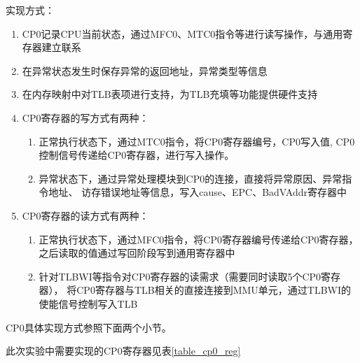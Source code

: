             实现方式：
            \begin{enumerate}
                \item
                    CP0记录CPU当前状态，通过MFC0、MTC0指令等进行读写操作，与通用寄存器建立联系
                \item
                    在异常状态发生时保存异常的返回地址，异常类型等信息
                \item
                    在内存映射中对TLB表项进行支持，为TLB充填等功能提供硬件支持
                \item
                    CP0寄存器的写方式有两种：
                    \begin{enumerate}
                        \item
                            正常执行状态下，通过MTC0指令，将CP0寄存器编号，CP0写入值,
                            CP0控制信号传递给CP0寄存器，进行写入操作。
                        \item
                            异常状态下，通过异常处理模块到CP0的连接，直接将异常原因、异常指令地址、
                            访存错误地址等信息，写入cause、EPC、BadVAddr寄存器中
                    \end{enumerate}
                \item
                    CP0寄存器的读方式有两种：
                    \begin{enumerate}
                        \item
                            正常执行状态下，通过MFC0指令，将CP0寄存器编号传递给CP0寄存器，
                            之后读取的值通过写回阶段写到通用寄存器中
                        \item
                            针对TLBWI等指令对CP0寄存器的读需求（需要同时读取5个CP0寄存器），
                            将CP0寄存器与TLB相关的直接连接到MMU单元，通过TLBWI的使能信号控制写入TLB
                    \end{enumerate}
            \end{enumerate}

            CP0具体实现方式参照下面两个小节。

            此次实验中需要实现的CP0寄存器见表\ref{table_cp0_reg}

